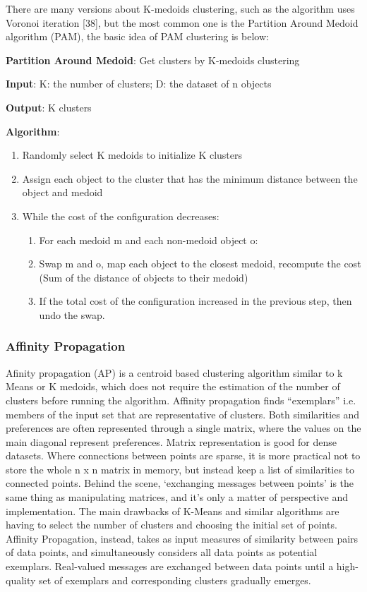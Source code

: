 \documentclass[a4paper, 12pt]{article}
\begin{document}
There are many versions about K-medoids clustering, such as the algorithm uses Voronoi iteration [38], but the most common one is the Partition Around Medoid algorithm (PAM), the basic idea of PAM clustering is below:

\textbf{Partition Around Medoid}: Get clusters by K-medoids clustering

\textbf{Input}: K: the number of clusters; D: the dataset of n objects

\textbf{Output}: K clusters

\textbf{Algorithm}:

\begin{enumerate}
    \item Randomly select K medoids to initialize K clusters
    \item Assign each object to the cluster that has the minimum distance between the object and medoid
    \item While the cost of the configuration decreases:
    \begin{enumerate}
        \item For each medoid m and each non-medoid object o:
        \item Swap m and o, map each object to the closest medoid, recompute the cost (Sum of the distance of objects to their medoid)
        \item If the total cost of the configuration increased in the previous step, then undo the swap.
    \end{enumerate}
\end{enumerate}


\subsubsection{Affinity Propagation}
Afinity propagation (AP) is a centroid based clustering algorithm similar to k Means or K medoids, which does not require the estimation of the number of clusters before running the algorithm. Affinity propagation finds “exemplars” i.e. members of the input set that are representative of clusters.
Both similarities and preferences are often represented through a single matrix, where the values on the main diagonal represent preferences. Matrix representation is good for dense datasets. Where connections between points are sparse, it is more practical not to store the whole n x n matrix in memory, but instead keep a list of similarities to connected points. Behind the scene, ‘exchanging messages between points’ is the same thing as manipulating matrices, and it’s only a matter of perspective and implementation.
The main drawbacks of K-Means and similar algorithms are having to select the number of clusters and choosing the initial set of points. Affinity Propagation, instead, takes as input measures of similarity between pairs of data points, and simultaneously considers all data points as potential exemplars. Real-valued messages are exchanged between data points until a high-quality set of exemplars and corresponding clusters gradually emerges.
\end{document}
